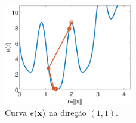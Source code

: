      \begin{figure}[!h]
         \centering
         \includegraphics[width=0.5\textwidth]{chapters/minimization-fx/mfiles/fx3/plotfx4.eps}
         \caption{Curva $e(\VECTOR{x})$ na direção $(1,1)$.}
         \label{fig:ex:minfxbCfxb4:b}
     \end{figure}


